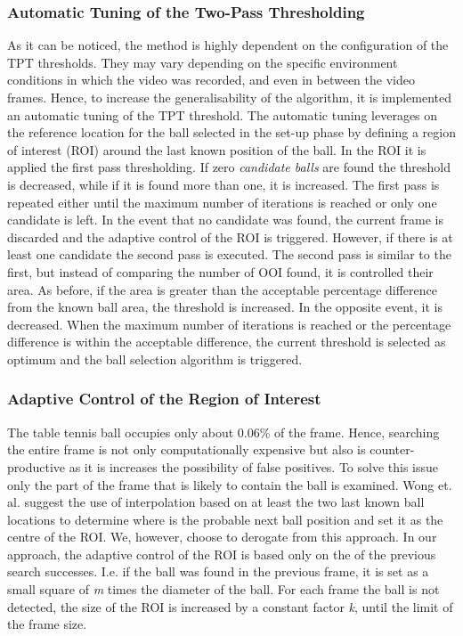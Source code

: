 \documentclass[a4paper]{article}
\begin{document}
\subsubsection{Automatic Tuning of the Two-Pass Thresholding}
As it can be noticed, the method is highly dependent on the configuration of the TPT thresholds. They may vary depending on the specific environment conditions in which the video was recorded, and even in between the video frames. Hence, to increase the generalisability of the algorithm, it is implemented an automatic tuning of the TPT threshold.
The automatic tuning leverages on the reference location for the ball selected in the set-up phase by defining a region of interest (ROI) around the last known position of the ball. In the ROI it is applied the first pass thresholding. If zero \textit{candidate balls} are found the threshold is decreased, while if it is found more than one, it is increased. The first pass is repeated either until the maximum number of iterations is reached or only one candidate is left. In the event that no candidate was found, the current frame is discarded and the adaptive control of the ROI is triggered. However, if there is at least one candidate the second pass is executed. The second pass is similar to the first, but instead of comparing the number of OOI found, it is controlled their area. As before, if the area is greater than the acceptable percentage difference from the known ball area, the threshold is increased. In the opposite event, it is decreased. When the maximum number of iterations is reached or the percentage difference is within the acceptable difference, the current threshold is selected as optimum and the ball selection algorithm is triggered.

\subsubsection{Adaptive Control of the Region of Interest}
The table tennis ball occupies only about 0.06\% of the frame. Hence, searching the entire frame is not only computationally expensive but also is counter-productive as it is increases the possibility of false positives. To solve this issue only the part of the frame that is likely to contain the ball is examined. Wong et. al.\cite{Wong} suggest the use of interpolation based on at least the two last known ball locations to determine where is the probable next ball position and set it as the centre of the ROI. We, however, choose to derogate from this approach.
In our approach, the adaptive control of the ROI is based only on the of the previous search successes. I.e. if the ball was found in the previous frame, it is set as a small square of \textit{m} times the diameter of the ball. For each frame the ball is not detected, the size of the ROI is increased by a constant factor \textit{k}, until the limit of the frame size.
\end{document}
